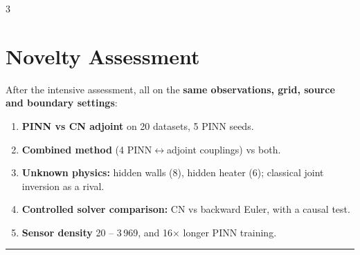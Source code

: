 \documentclass[a0,portrait]{a0poster}
\newcommand{\hl}[1]{\textbf{\color{NavyBlue}#1}}
\begin{document}
\begin{minipage}[c]{\linewidth}
\begin{framed}
\begin{multicols}{3}
\section*{Novelty Assessment}
After the intensive assessment, all on the \hl{same observations, grid, source and boundary settings}:
\begin{enumerate}[leftmargin=1.4em, itemsep=4pt]
\item \textbf{PINN vs CN adjoint} on 20 datasets, 5 PINN seeds.
\item \textbf{Combined method} (4 PINN$\leftrightarrow$adjoint couplings) vs both.
\item \textbf{Unknown physics:} hidden walls (8), hidden heater (6); classical joint inversion as a rival.
\item \textbf{Controlled solver comparison:} CN vs backward Euler, with a causal test.
\item \textbf{Sensor density} 20 -- 3\,969, and 16$\times$ longer PINN training.
\end{enumerate}

\end{multicols}
\vspace{-0.6cm}
\color{NavyBlue}\noindent\rule{\linewidth}{15pt}\color{Black}

\end{framed}
\end{minipage}
\end{document}
